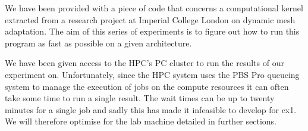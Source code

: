 We have been provided with a piece of code that concerns a computational kernel extracted from a research project at Imperial College London on dynamic mesh adaptation\cite{pragmatic}.
The aim of this series of experiments is to figure out how to run this program as fast as possible on a given architecture.

We have been given access to the HPC's PC cluster to run the results of our experiment on.
Unfortunately, since the HPC system uses the PBS Pro queueing system to manage the execution of jobs on the compute resources it can often take some time to run a single result. The wait times can be up to twenty minutes for a single job and sadly this has made it infeasible to develop for cx1. We will therefore optimise for the lab machine detailed in further sections.
